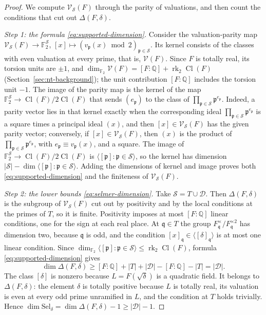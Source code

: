 \documentclass[11pt]{article}
\theoremstyle{plain}
\theoremstyle{definition}
\theoremstyle{remark}
\DeclareMathOperator{\Cl}{Cl}
\newcommand{\Q}{\mathbb Q}
\newcommand{\F}{\mathbb F}
\begin{document}
\begin{proof}
We compute $\mathcal V_{\mathcal S}(F)$ through the parity of valuations,
and then count the conditions that cut out $\Delta(F,\delta)$.

\emph{Step 1: the formula \eqref{eq:supported-dimension}.}  Consider the
valuation-parity map
$\mathcal V_{\mathcal S}(F)\to\F_2^{\mathcal S}$,
$[x]\mapsto(v_{\mathfrak p}(x)\bmod2)_{\mathfrak p\in\mathcal S}$.  Its
kernel consists of the classes with even valuation at every prime, that
is, $\mathcal V(F)$.  Since $F$ is totally real, its torsion units are
$\pm1$, and $\dim_{\F_2}\mathcal V(F)=[F:\Q]+\operatorname{rk}_2\Cl(F)$
(Section~\ref{sec:nt-background}); the unit contribution $[F:\Q]$
includes the torsion unit $-1$.  The image of the parity map is the
kernel of the map $\F_2^{\mathcal S}\to\Cl(F)/2\Cl(F)$ that sends
$(e_{\mathfrak p})$ to the class of $\prod_{\mathfrak p\in\mathcal
S}\mathfrak p^{e_{\mathfrak p}}$.  Indeed, a parity vector lies in that
kernel exactly when the corresponding ideal
$\prod_{\mathfrak p\in\mathcal S}\mathfrak p^{e_{\mathfrak p}}$ is a square
times a principal ideal $(x)$, and then $[x]\in\mathcal V_{\mathcal S}(F)$
has the given parity vector; conversely, if
$[x]\in\mathcal V_{\mathcal S}(F)$, then $(x)$ is the product of
$\prod_{\mathfrak p\in\mathcal S}\mathfrak p^{e_{\mathfrak p}}$, with
$e_{\mathfrak p}\equiv v_{\mathfrak p}(x)$, and a square.  The image of
$\F_2^{\mathcal S}\to\Cl(F)/2\Cl(F)$ is
$\langle[\mathfrak p]:\mathfrak p\in\mathcal S\rangle$, so the kernel has
dimension $|\mathcal S|-\dim\langle[\mathfrak p]:\mathfrak p\in\mathcal
S\rangle$.  Adding the dimensions of kernel and image proves both
\eqref{eq:supported-dimension} and the finiteness of
$\mathcal V_{\mathcal S}(F)$.

\emph{Step 2: the lower bounds \eqref{eq:selmer-dimension}.}  Take
$\mathcal S=T\cup\mathcal D$.  Then $\Delta(F,\delta)$ is the subgroup of
$\mathcal V_{\mathcal S}(F)$ cut out by positivity and by the local
conditions at the primes of $T$, so it is finite.  Positivity imposes at
most $[F:\Q]$ linear conditions, one for the sign at each real place.  At
$\mathfrak q\in T$ the group $F_{\mathfrak q}^\times/F_{\mathfrak
q}^{\times2}$ has dimension two, because $\mathfrak q$ is odd, and the
condition $[x]_{\mathfrak q}\in\langle[\delta]_{\mathfrak q}\rangle$ is at
most one linear condition.  Since
$\dim_{\F_2}\langle[\mathfrak p]:\mathfrak p\in\mathcal S\rangle\le
\operatorname{rk}_2\Cl(F)$, formula \eqref{eq:supported-dimension} gives
\[
 \dim\Delta(F,\delta)\ge
 [F:\Q]+|T|+|\mathcal D|-[F:\Q]-|T|=|\mathcal D|.
\]
The class $[\delta]$ is nonzero because $L=F(\sqrt\delta)$ is a quadratic
field.  It belongs to $\Delta(F,\delta)$: the element $\delta$ is totally
positive because $L$ is totally real, its valuation is even at every odd
prime unramified in $L$, and the condition at $T$ holds trivially.  Hence
$\dim\mathrm{Sel}_\delta=\dim\Delta(F,\delta)-1\ge|\mathcal D|-1$.


\end{proof}
\end{document}

